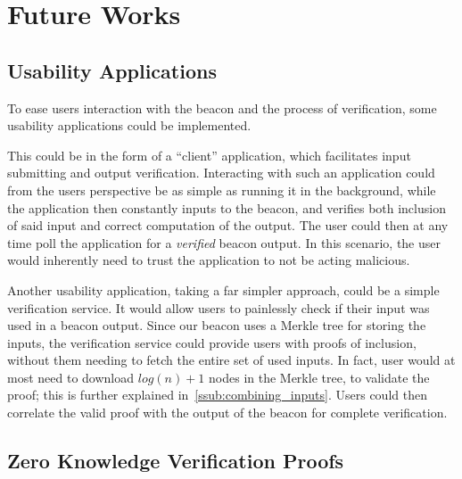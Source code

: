 \section{Future Works}%
\label{sec:future_works}

\subsection{Usability Applications}%
\label{sub:usability_applications}
To ease users interaction with the beacon and the process of verification, some usability applications could be implemented.

This could be in the form of a \enquote{client} application, which facilitates input submitting and output verification.
Interacting with such an application could from the users perspective be as simple as running it in the background, while the application then constantly inputs to the beacon, and verifies both inclusion of said input and correct computation of the output.
The user could then at any time poll the application for a \emph{verified} beacon output.
In this scenario, the user would inherently need to trust the application to not be acting malicious.

Another usability application, taking a far simpler approach, could be a simple verification service.
It would allow users to painlessly check if their input was used in a beacon output.
Since our beacon uses a Merkle tree for storing the inputs, the verification service could provide users with proofs of inclusion, without them needing to fetch the entire set of used inputs.
In fact, user would at most need to download $log(n) + 1$ nodes in the Merkle tree, to validate the proof; this is further explained in~\vref{ssub:combining_inputs}.
Users could then correlate the valid proof with the output of the beacon for complete verification.

\subsection{Zero Knowledge Verification Proofs}%
\label{sub:zero_knowledge_verification_proofs}

